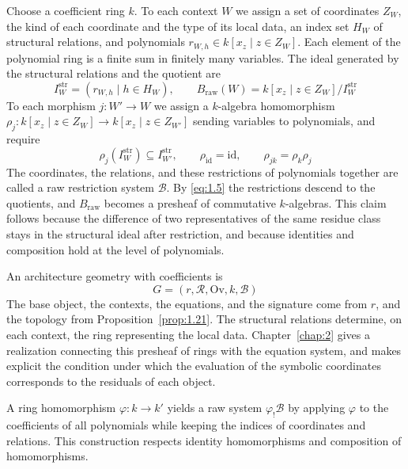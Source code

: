 \begin{definition}\label{def:1.25}

Choose a coefficient ring $k$. To each context $W$ we assign a set of
coordinates $Z_W$, the kind of each coordinate and the type of its local data,
an index set $H_W$ of structural relations, and polynomials
$r_{W,h}\in k[x_z\mid z\in Z_W]$.
Each element of the polynomial ring is a finite sum in finitely many variables.
The ideal generated by the structural relations and the quotient are
\[
I_W^{\mathrm{str}}=(r_{W,h}\mid h\in H_W),
\qquad
B_{\mathrm{raw}}(W)=k[x_z\mid z\in Z_W]/I_W^{\mathrm{str}}
\]
To each morphism $j:W'\to W$ we assign a $k$-algebra homomorphism
$\rho_j:k[x_z\mid z\in Z_W]\to k[x_z\mid z\in Z_{W'}]$ sending variables to
polynomials, and require
\begin{equation*}
\rho_j(I_W^{\mathrm{str}})\subseteq I_{W'}^{\mathrm{str}},
\qquad
\rho_{\mathrm{id}}=\mathrm{id},
\qquad
\rho_{jk}=\rho_k\rho_j
\tag{1.5}\label{eq:1.5}
\end{equation*}
The coordinates, the relations, and these restrictions of polynomials together
are called a raw restriction system $\mathcal{B}$.
By \eqref{eq:1.5} the restrictions descend to the quotients, and
$B_{\mathrm{raw}}$ becomes a presheaf of commutative $k$-algebras.
This claim follows because the difference of two representatives of the same
residue class stays in the structural ideal after restriction, and because
identities and composition hold at the level of polynomials.

An architecture geometry with coefficients is
\[
G=(r,\mathcal{R},\mathrm{Ov},k,\mathcal{B})
\]
The base object, the contexts, the equations, and the signature come from $r$,
and the topology from Proposition~\ref{prop:1.21}.
The structural relations determine, on each context, the ring representing the
local data.
Chapter~\ref{chap:2} gives a realization connecting this presheaf of rings with
the equation system, and makes explicit the condition under which the
evaluation of the symbolic coordinates corresponds to the residuals of each
object.

\end{definition}

\begin{lemma}\label{lem:1.26}

A ring homomorphism $\varphi:k\to k'$ yields a raw system
$\varphi_!\mathcal{B}$ by applying $\varphi$ to the coefficients of all
polynomials while keeping the indices of coordinates and relations.
This construction respects identity homomorphisms and composition of
homomorphisms.

\end{lemma}

